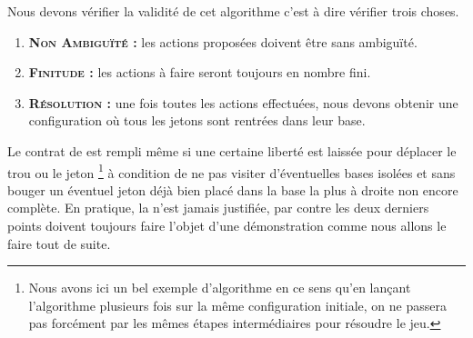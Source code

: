 \bigskip

Nous devons vérifier la validité de cet algorithme c'est à dire vérifier trois choses.

\begin{enumerate}
	\item \textbf{\textsc{Non Ambiguïté :}} les actions proposées doivent être sans ambiguïté.

	\item \textbf{\textsc{Finitude :}} les actions à faire seront toujours en nombre fini.

	\item \textbf{\textsc{Résolution :}} une fois toutes les actions effectuées, nous devons obtenir une configuration où tous les jetons sont rentrées dans leur base.
\end{enumerate}


Le contrat de  est rempli même si une certaine liberté est laissée pour déplacer le trou ou le jeton 
\footnote{
	Nous avons ici un bel exemple d'algorithme  en ce sens qu'en lançant l'algorithme plusieurs fois sur la même configuration initiale, on ne passera pas forcément par les mêmes étapes intermédiaires pour résoudre le jeu.
}
à condition de ne pas visiter d'éventuelles bases isolées et sans bouger un éventuel jeton déjà bien placé dans la base la plus à droite non encore complète.
En pratique, la  n'est jamais justifiée, par contre les deux derniers points doivent toujours faire l'objet d'une  démonstration comme nous allons le faire tout de suite.

